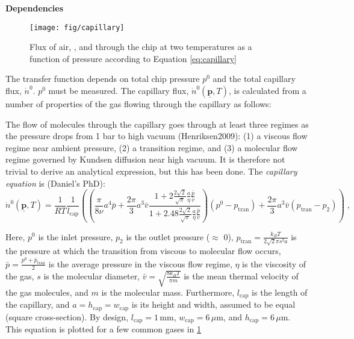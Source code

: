 \documentclass{article}
\renewcommand{\vec}[1]{\underline{\mathbf{#1}}}
\begin{document}
\noindent\textbf{Dependencies}


\begin{figure}
	\centering
	\texttt{[image: fig/capillary]}
	\caption{Flux of air, , and  through the chip at two temperatures as a function of pressure according to Equation \ref{eq:capillary}}
	\label{fig:cap}
\end{figure}

The transfer function depends on total chip pressure $p^0$ and the total capillary flux, $\dot{n}^0$. $p^0$ must be measured. The capillary flux, $\dot{n}^0(\underline{\mathbf{p}}, T)$, is calculated from a number of properties of the gas flowing through the capillary as follows:

The flow of molecules through the capillary goes through at least three regimes as the pressure drops from 1 bar to high vacuum (Henriksen2009): (1) a viscous flow regime near ambient pressure, (2) a transition regime, and (3) a molecular flow regime governed by Kundsen diffusion near high vacuum. It is therefore not trivial to derive an analytical expression, but this has been done. The \textit{capillary equation} is (Daniel's PhD):
\begin{equation}
\dot{n}^0(\vec{p}, T) = \frac{1}{R T}\frac{1}{l_\text{cap}} 
\left(\left( 
\frac{\pi}{8\nu}a^4\bar{p} + \frac{2\pi}{3}a^3\bar{v} \frac {1+2\frac{2\sqrt{2}}{\sqrt{\pi}}\frac{a}{\eta}\frac{\bar{p}}{\bar{v}}} {1+2.48\frac{2\sqrt{2}}{\sqrt{\pi}}\frac{a}{\eta}\frac{\bar{p}}{\bar{v}}}
\right)
\left(p^0-p_{\mathrm{tran}}\right) 
+ 
\frac{2\pi}{3}a^3\bar{v}\left(p_{\mathrm{tran}}-p_2\right)\right) 
\;, \label{eq:capillary}
\end{equation}

Here, $p^0$ is the inlet pressure, $p_2$ is the outlet pressure ($\approx$ 0), $p_{\mathrm{tran}}=\frac{k_B T}{2 \sqrt{2}\pi s^2 a}$ is the pressure at which the transition from viscous to molecular flow occurs, $\bar{p}=\frac{p^0 + \bar{p}_{\mathrm{tran}}}{2}$ is the average pressure in the viscous flow regime, $\eta$ is the viscosity of the gas, $s$ is the molecular diameter, $\bar{v}=\sqrt{\frac{8 k_B T}{\pi m}}$ is the mean thermal velocity of the gas molecules, and $m$ is the molecular mass. Furthermore, $l_\text{cap}$ is the length of the capillary, and $a=h_\text{cap}=w_\text{cap}$ is its height and width, assumed to be equal (square cross-section). By design, $l_\text{cap} = 1\,\text{mm}$, $w_\text{cap} = 6\,\mu\text{m}$, and $h_\text{cap} = 6\,\mu\text{m}$. This equation is plotted for a few common gases in \ref{fig:cap}
\end{document}
